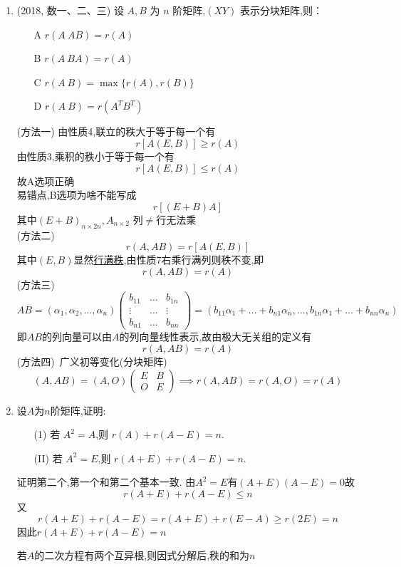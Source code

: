 \documentclass[12pt, a4paper, oneside, UTF8]{ctexbook}
\begin{document}
\begin{enumerate}[label=\arabic*.,start=7]
    \item (2018, 数一、二、三) 设 $ A, B $ 为 $ n $ 阶矩阵,$ (XY) $ 表示分块矩阵,则：
    \begin{enumerate}
        \item[A] $ r(A\ AB) = r(A) $
        \item[B] $ r(A\ BA) = r(A) $
        \item[C] $ r(A\ B) = \max\{r(A), r(B)\} $
        \item[D] $ r(A\ B) = r(A^T B^T) $
    \end{enumerate}
    
    \begin{solution}
    (方法一) 由性质4,联立的秩大于等于每一个有
    $$
    r\left[A(E,B)\right] \geq r(A)
    $$
    由性质3,乘积的秩小于等于每一个有
    $$
    r\left[A(E,B)\right] \leq r(A)
    $$
    故A选项正确 \\
    易错点,B选项为啥不能写成
    $$
    r\left[(E+B)A\right] 
    $$
    其中$(E+B)_{n\times 2n},A_{n\times 2}$ 列$\neq$行无法乘 \\
    (方法二) 
    $$
    r(A,AB)=r\left[A(E,B)\right]
    $$
    其中$(E,B)$显然\underline{行满秩},由性质7右乘行满列则秩不变,即
    $$
    r(A,AB)=r(A) 
    $$
    (方法三)
    $$
    AB=\left(\alpha_1,\alpha_2,\ldots,\alpha_n\right)\begin{pmatrix}
        b_{11} & \ldots & b_{1n} \\
        \vdots & \ldots & \vdots \\
        b_{n1} & \ldots & b_{nn}
    \end{pmatrix} = \left(b_{11}\alpha_1+\ldots+b_{n1}\alpha_n,\ldots,b_{1n}\alpha_1+\ldots+b_{nn}\alpha_n\right)
    $$
    即$AB$的列向量可以由$A$的列向量线性表示,故由极大无关组的定义有
    $$
    r(A,AB)=r(A)
    $$
    (方法四)\ 广义初等变化(分块矩阵) 
    $$
    (A,AB)=(A,O)\begin{pmatrix}
        E & B \\
        O & E 
    \end{pmatrix} \implies r(A,AB)=r(A,O)=r(A)
    $$
    \end{solution}

    \item 设$A$为$n$阶矩阵,证明:
    \begin{enumerate}
        \item [(1)] 若 $ A^2 = A $,则 $ r(A) + r(A - E) = n $.
        \item [(II)] 若 $ A^2 = E $,则 $ r(A + E) + r(A - E) = n $.
    \end{enumerate}
    
    \begin{solution}
    证明第二个,第一个和第二个基本一致. 由$A^2=E$有$(A+E)(A-E)=0$故
    $$
    r(A+E)+r(A-E)\leq n 
    $$
    又
    $$
    r(A+E)+r(A-E) = r(A+E)+r(E-A) \geq r(2E) = n
    $$
    因此$r(A+E)+r(A-E)=n$
    \end{solution}

    \begin{tcolorbox}
        若$A$的二次方程有两个互异根,则因式分解后,秩的和为$n$
    \end{tcolorbox}
\end{enumerate}
\end{document}
